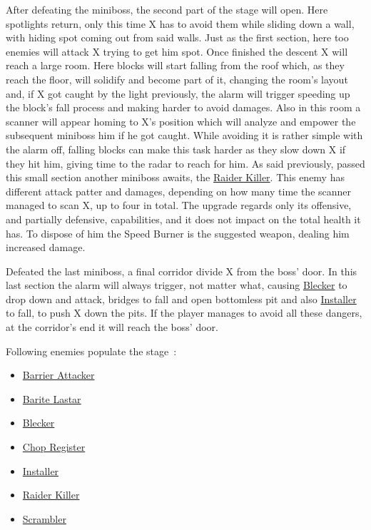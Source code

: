 After defeating the miniboss, the second part of the stage will open. Here spotlights return, only this time X has to avoid them while sliding down a wall, with hiding spot coming out from said walls. Just as the first section, here too enemies will attack X trying to get him spot. Once finished the descent X will reach a large room. Here blocks will start falling from the roof which, as they reach the floor, will solidify and become part of it, changing the room's layout and, if X got caught by the light previously, the alarm will trigger speeding up the block's fall process and making harder to avoid damages. Also in this room a scanner will appear homing to X's position which will analyze and empower the subsequent miniboss him if he got caught. While avoiding it is rather simple with the alarm off, falling blocks can make this task harder as they slow down X if they hit him, giving time to the radar to reach for him. As said previously, passed this small section another miniboss awaits, the \hyperlink{miniboss:Raider_Killer}{Raider Killer}. This enemy has different attack patter and damages, depending on how many time the scanner managed to scan X, up to four in total. The upgrade regards only its offensive, and partially defensive, capabilities, and it does not impact on the total health it has. To dispose of him the Speed Burner is the suggested weapon, dealing him increased damage.

Defeated the last miniboss, a final corridor divide X from the boss' door. In this last section the alarm will always trigger, not matter what, causing \hyperlink{enem:Blecker}{Blecker} to drop down and attack, bridges to fall and open bottomless pit and also \hyperlink{enem:Installer}{Installer} to fall, to push X down the pits. If the player manages to avoid all these dangers, at the corridor's end it will reach the boss' door.

Following enemies populate the stage~\cite{wiki:Central_computer}:
\begin{itemize}
	\item \hyperlink{enem:Barrier_Attacker}{Barrier Attacker}
	\item \hyperlink{enem:Barite_Lastar}{Barite Lastar}
	\item \hyperlink{enem:Blecker}{Blecker}
	\item \hyperlink{miniboss:Chop_Register}{Chop Register}
	\item \hyperlink{enem:Installer}{Installer}
	\item \hyperlink{miniboss:Raider_Killer}{Raider Killer}
	\item \hyperlink{enem:Scrambler}{Scrambler}
\end{itemize}

